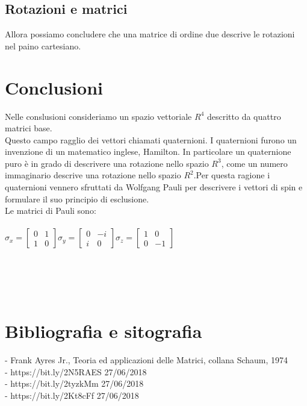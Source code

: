 \documentclass[a4paper]{article}
\begin{document}
\subsection{Rotazioni e matrici}
Allora possiamo concludere che una matrice di ordine due descrive le rotazioni nel paino cartesiano.
\section{Conclusioni}
Nelle conslusioni consideriamo un spazio vettoriale $R^4$ descritto da quattro matrici base.
\\Questo campo ragglio dei vettori chiamati quaternioni. I quaternioni furono un invenzione di un matematico inglese, Hamilton. In particolare un quaternione puro è in grado di descrivere una rotazione nello spazio $R^3$, come un numero immaginario descrive una rotazione nello spazio $R^2$.Per questa ragione i quaternioni vennero sfruttati da Wolfgang Pauli per descrivere i vettori di spin e formulare il suo principio di esclusione.
\\
Le matrici di Pauli sono:
\\
\\$\sigma_{x}=\left[\begin{matrix}0&1\\ 1&0 \end{matrix}\right] \sigma_{y}=\left[\begin{matrix}0&-\textit{i}\\ \textit{i}&0 \end{matrix}\right] \sigma_{z}=\left[\begin{matrix}1&0\\ 0&-1 \end{matrix}\right]
$
\\
\\
\\
\\
\\

\section{Bibliografia e sitografia}
- Frank Ayres Jr., Teoria ed applicazioni delle Matrici, collana Schaum, 1974\\
- https://bit.ly/2N5RAES 27/06/2018\\
- https://bit.ly/2tyzkMm 27/06/2018\\
- https://bit.ly/2Kt8cFf 27/06/2018
\end{document}
